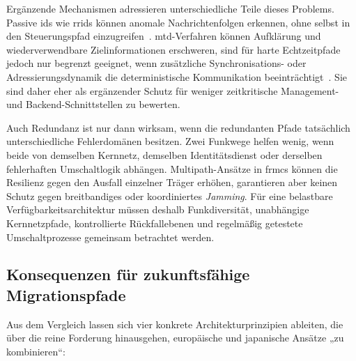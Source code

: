 \documentclass[runningheads]{res/llncs}
\begin{document}
Ergänzende Mechanismen adressieren unterschiedliche Teile dieses Problems. Passive \gls{ids} wie \gls{rrids} können anomale Nachrichtenfolgen erkennen, ohne selbst in den Steuerungspfad einzugreifen~\parencite[S. 60--63]{melaragnoRail2016}. \gls{mtd}-Verfahren können Aufklärung und wiederverwendbare Zielinformationen erschweren, sind für harte Echtzeitpfade jedoch nur begrenzt geeignet, wenn zusätzliche Synchronisations- oder Adressierungsdynamik die deterministische Kommunikation beeinträchtigt~\parencite[S. 121]{poschingerOpenMTD2020}. Sie sind daher eher als ergänzender Schutz für weniger zeitkritische Management- und Backend-Schnittstellen zu bewerten.

Auch Redundanz ist nur dann wirksam, wenn die redundanten Pfade tatsächlich unterschiedliche Fehlerdomänen besitzen. Zwei Funkwege helfen wenig, wenn beide von demselben Kernnetz, demselben Identitätsdienst oder derselben fehlerhaften Umschaltlogik abhängen. Multipath-Ansätze in \gls{frmcs} können die Resilienz gegen den Ausfall einzelner Träger erhöhen, garantieren aber keinen Schutz gegen breitbandiges oder koordiniertes \textit{Jamming}. Für eine belastbare Verfügbarkeitsarchitektur müssen deshalb Funkdiversität, unabhängige Kernnetzpfade, kontrollierte Rückfallebenen und regelmäßig getestete Umschaltprozesse gemeinsam betrachtet werden.

\subsection{Konsequenzen für zukunftsfähige Migrationspfade}
\label{sec:Zukunftsfähige_Migrationspfade_FRMCS_und_IEC_62280}
Aus dem Vergleich lassen sich vier konkrete Architekturprinzipien ableiten, die über die reine Forderung hinausgehen, europäische und japanische Ansätze „zu kombinieren“:
\end{document}
